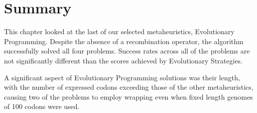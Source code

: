 \section{Summary}
This chapter looked at the last of our selected metaheuristics, Evolutionary Programming. Despite the absence of a recombination operator, the algorithm successfully solved all four problems. Success rates across all of the problems are not significantly different than the scores achieved by Evolutionary Strategies. 

A significant aspect of Evolutionary Programming solutions was their length, with the number of expressed codons exceeding those of the other metaheuristics, causing two of the problems to employ wrapping even when fixed length genomes of 100 codons were used.











